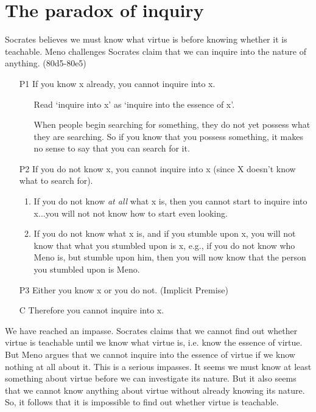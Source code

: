 \documentclass[10 pt]{article}
\begin{document}
\section*{The paradox of inquiry}
Socrates believes we must know what virtue is before knowing whether it is teachable. Meno challenges Socrates claim that we can inquire into the nature of anything. (80d5-80e5)


\begin{enumerate}
\item[P1] If you know x already, you cannot inquire into x. 
\begin{enumerate}
\item[] Read `inquire into x' as `inquire into the essence of x'. 
\item[] When people begin searching for something, they do not yet possess what they are searching. So if you know that you possess something, it makes no sense to say that you can search for it.
\end{enumerate}
\item[P2] If you do not know x, you cannot inquire into x (since X doesn't know what to search for).
\begin{enumerate}
\item If you do not know \emph{at all} what x is, then you cannot start to inquire into x...you will not not know how to start even looking.
\item If you do not know what x is, and if you stumble upon x, you will not know that what you stumbled upon is x, e.g., if you do not know who Meno is, but stumble upon him, then you will now know that the person you stumbled upon is Meno. 
\end{enumerate}
\item[P3] Either you know x or you do not. (Implicit Premise) 
\item[C] Therefore you cannot inquire into x.
\end{enumerate}

We have reached an impasse.  Socrates claims that we cannot find out whether virtue is teachable until we know what virtue is, i.e. know the essence of virtue.  But Meno argues that we cannot inquire into the essence of virtue if we know nothing at all about it. This is a serious impasses. It seems we must know at least something about virtue before we can investigate its nature. But it also seems that we cannot know anything about virtue without already knowing its nature. So, it follows that it is impossible to find out whether virtue is teachable. 
\end{document}
